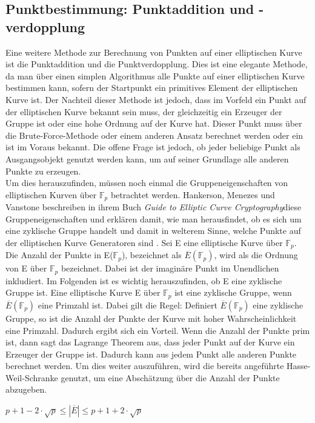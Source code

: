 \subsection{Punktbestimmung: Punktaddition und -verdopplung}
Eine weitere Methode zur Berechnung von Punkten auf einer elliptischen Kurve ist die Punktaddition und die Punktverdopplung. Dies ist eine elegante Methode, da man über einen simplen Algorithmus alle Punkte auf einer elliptischen Kurve bestimmen kann, sofern der Startpunkt ein primitives Element der elliptischen Kurve ist. Der Nachteil dieser Methode ist jedoch, dass im Vorfeld ein Punkt auf der elliptischen Kurve bekannt sein muss, der gleichzeitig ein Erzeuger der Gruppe ist oder eine hohe Ordnung auf der Kurve hat. Dieser Punkt muss über die Brute-Force-Methode oder einem anderen Ansatz berechnet werden oder ein ist im Voraus bekannt. Die offene Frage ist jedoch, ob jeder beliebige Punkt als Ausgangsobjekt genutzt werden kann, um auf seiner Grundlage alle anderen Punkte zu erzeugen.\\

Um dies herauszufinden, müssen noch einmal die Gruppeneigenschaften von elliptischen Kurven über $\mathbb{F}_{p}$ betrachtet werden. Hankerson, Menezes und Vanstone beschreiben in ihrem Buch \glqq\textit{Guide to Elliptic Curve Cryptography}\grqq diese Gruppeneigenschaften und erklären damit, wie man herausfindet, ob es sich um eine zyklische Gruppe handelt und damit in welterem Sinne, welche Punkte auf der elliptischen Kurve Generatoren sind \cite[S. 82-84]{HankersonMenezesVanstone.2004}. Sei E eine elliptische Kurve über $\mathbb{F}_{p}$. Die Anzahl der Punkte in E($\mathbb{F}_{p}$), bezeichnet als
$\overline{E}(\mathbb{F}_{p})$, wird als die Ordnung von E über $\mathbb{F}_{p}$ bezeichnet. Dabei ist der imaginäre Punkt im Unendlichen inkludiert. Im Folgenden ist es wichtig herauszufinden, ob E eine zyklische Gruppe ist. Eine elliptische Kurve E über $\mathbb{F}_{p}$ ist eine zyklische Gruppe, wenn $\overline{E}(\mathbb{F}_{p})$ eine Primzahl ist. Dabei gilt die Regel: Definiert $\overline{E}(\mathbb{F}_{p})$ eine zyklische Gruppe, so ist die Anzahl der Punkte der Kurve mit hoher Wahrscheinlichkeit eine Primzahl. Dadurch ergibt sich ein Vorteil. Wenn die Anzahl der Punkte prim ist, dann sagt das Lagrange Theorem aus, dass jeder Punkt auf der Kurve ein Erzeuger der Gruppe ist. Dadurch kann aus jedem Punkt alle anderen Punkte berechnet werden. Um dies weiter auszuführen, wird die bereits angeführte Hasse-Weil-Schranke genutzt, um eine Abschätzung über die Anzahl der Punkte abzugeben.
\begin{center}
$p + 1 - 2 \cdot \sqrt{p} \leq | \overline{E} | \leq p + 1 + 2 \cdot \sqrt{p}$
\end{center} 

